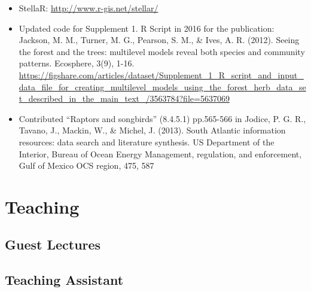 \documentclass[11pt,a4paper,]{moderncv}
\begin{document}
\begin{itemize}
\item
  StellaR: \url{http://www.r-gis.net/stellar/}
\item
  Updated code for Supplement 1. R Script in 2016 for the publication:
  Jackson, M. M., Turner, M. G., Pearson, S. M., \& Ives, A. R. (2012).
  Seeing the forest and the trees: multilevel models reveal both species
  and community patterns. Ecosphere, 3(9), 1-16.
  \url{https://figshare.com/articles/dataset/Supplement_1_R_script_and_input_data_file_for_creating_multilevel_models_using_the_forest_herb_data_set_described_in_the_main_text_/3563784?file=5637069}
\item
  Contributed ``Raptors and songbirds'' (8.4.5.1) pp.565-566 in Jodice,
  P. G. R., Tavano, J., Mackin, W., \& Michel, J. (2013). South Atlantic
  information resources: data search and literature synthesis. US
  Department of the Interior, Bureau of Ocean Energy Management,
  regulation, and enforcement, Gulf of Mexico OCS region, 475, 587
\end{itemize}

\section{Teaching}\label{teaching}

\subsection{Guest Lectures}\label{guest-lectures}

\nopagebreak

\subsection{Teaching Assistant}\label{teaching-assistant}

\nopagebreak
\end{document}
